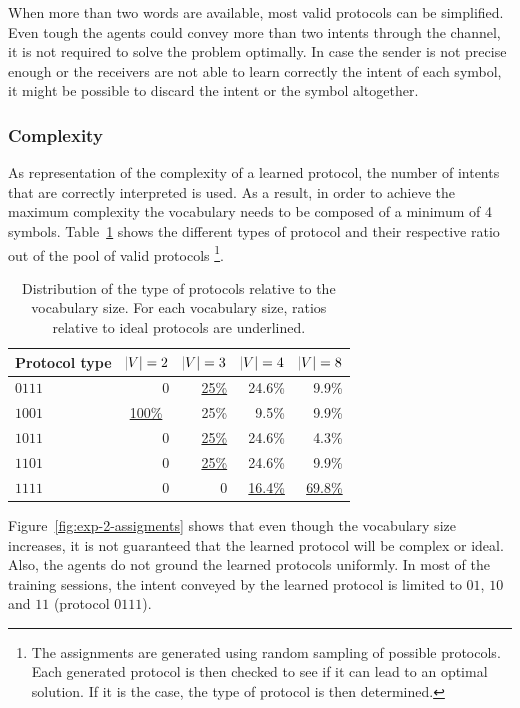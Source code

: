When more than two words are available, most valid protocols can be simplified. Even tough the agents could convey more than two intents through the channel, it is not required to solve the problem optimally. In case the sender is not precise enough or the receivers are not able to learn correctly the intent of each symbol, it might be possible to discard the intent or the symbol altogether.

\subsubsection*{Complexity}

As representation of the complexity of a learned protocol, the number of intents that are correctly interpreted is used. As a result, in order to achieve the maximum complexity the vocabulary needs to be composed of a minimum of 4 symbols. Table~\ref{tab:exp-2-assigments-distrib} shows the different types of protocol and their respective ratio out of the pool of valid protocols \footnote{The assignments are generated using random sampling of possible protocols. Each generated protocol is then checked to see if it can lead to an optimal solution. If it is the case, the type of protocol is then determined.}.


\begin{table}[H]
 \centering
    \begin{tabular}{lrrrr}
    \toprule
    Protocol type & $\abs{V}  = 2$ & $\abs{V}  = 3$ & $\abs{V}  = 4$ & $\abs{V}  = 8$ \\
    \midrule
    $0111$ & 0 & \underline{25\%} & 24.6\% & 9.9\% \\
    $1001$ & \underline{100\%}\ & 25\% & 9.5\% & 9.9\% \\
    $1011$ & 0 & \underline{25\%} & 24.6\% & 4.3\% \\
    $1101$ & 0 & \underline{25\%} & 24.6\% & 9.9\% \\
    $1111$ & 0 & 0 & \underline{16.4\%} &  \underline{69.8\%} \\
    \bottomrule
    \end{tabular}
    \caption[Distribution of protocol type]{Distribution of the type of protocols relative to the vocabulary size. For each vocabulary size, ratios relative to ideal protocols are underlined. }
    \label{tab:exp-2-assigments-distrib}
\end{table}

Figure~\ref{fig:exp-2-assigments} shows that even though the vocabulary size increases, it is not guaranteed that the learned protocol will be complex or ideal. Also, the agents do not ground the learned protocols uniformly. In most of the training sessions, the intent conveyed by the learned protocol is limited to $01$, $10$ and $11$ (protocol $0111$). 

